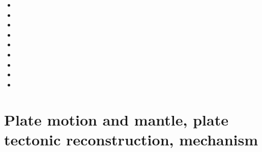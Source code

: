 \begin{small}
\begin{itemize}
\item[\nineteensixtynine]
\item[\nineteeneightytwo] 
\item[\nineteenninety] 
\item[\twothousand] 
\item[\twothousandsix] 
\item[\twothousandtwo] 
\item[\twothousandtwo] 
\item[\twothousandseven] 
\item[\twothousandfifteen] 
\end{itemize}
\end{small}

\section{Plate motion and mantle, plate tectonic reconstruction, mechanism}

